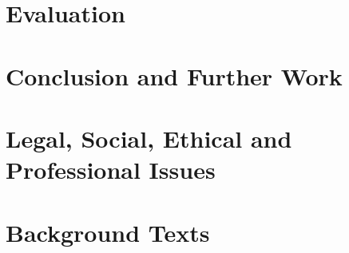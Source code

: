 \documentclass{article}
\begin{document}
\section{Evaluation}

\section{Conclusion and Further Work}

\section{Legal, Social, Ethical and Professional Issues}
\label{sec:issues}

\section{Background Texts}



\end{document}
